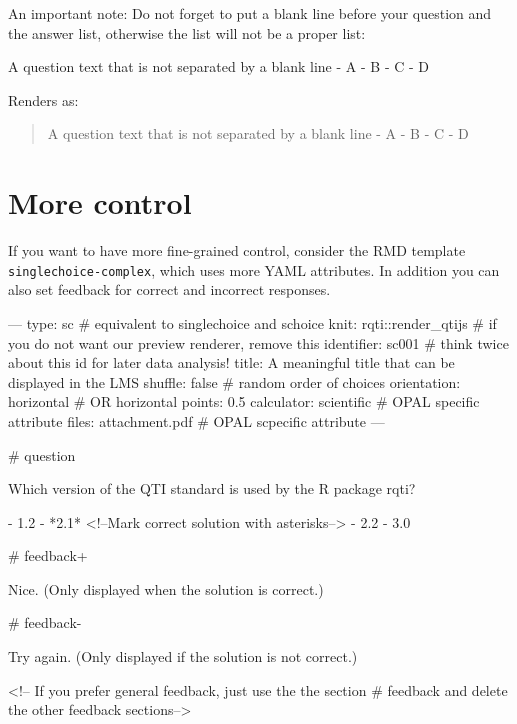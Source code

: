 \documentclass[twoside]{tufte-book}
\newenvironment{Shaded}{}{}
\newcommand{\NormalTok}[1]{#1}
\begin{document}
An important note: Do not forget to put a blank line before your question and the answer list, otherwise the list will not be a proper list:

\begin{Shaded}
\begin{Highlighting}[]
\NormalTok{A question text that is not separated by a blank line}
\NormalTok{{-} A}
\NormalTok{{-} B}
\NormalTok{{-} C}
\NormalTok{{-} D}
\end{Highlighting}
\end{Shaded}

Renders as:

\begin{quote}
A question text that is not separated by a blank line - A - B - C - D
\end{quote}

\section{More control}\label{more-control}

If you want to have more fine-grained control, consider the RMD template \texttt{singlechoice-complex}, which uses more YAML attributes. In addition you can also set feedback for correct and incorrect responses.

\begin{Shaded}
\begin{Highlighting}
---
type: sc # equivalent to singlechoice and schoice
knit: rqti::render_qtijs # if you do not want our preview renderer, remove this
identifier: sc001 # think twice about this id for later data analysis!
title: A meaningful title that can be displayed in the LMS
shuffle: false # random order of choices
orientation: horizontal # OR horizontal
points: 0.5
calculator: scientific # OPAL specific attribute
files: attachment.pdf # OPAL scpecific attribute
---

# question

Which version of the QTI standard is used by the R package rqti?

- 1.2
- *2.1* <!--Mark correct solution with asterisks-->
- 2.2
- 3.0

# feedback+

Nice. (Only displayed when the solution is correct.)

# feedback-

Try again. (Only displayed if the solution is not correct.)

<!-- If you prefer general feedback, just use the the section # feedback and
delete the other feedback sections-->
\end{Highlighting}
\end{Shaded}
\end{document}
